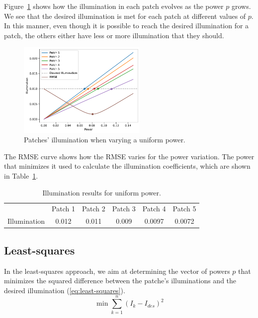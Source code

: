 \documentclass[11pt,a4paper]{article}
\begin{document}
Figure~\ref{fig:uniform-power} shows how the illumination in each patch evolves as the power $p$ grows. We see that the desired illumination is met for each patch at different values of $p$. In this manner, even though it is possible to reach the desired illumination for a patch, the others either have less or more illumination that they should.\\

\begin{figure}[!htb]
    \centering
    \includegraphics[width=0.55\textwidth]{figures/uniform-power.pdf}
    \caption{Patches' illumination when varying a uniform power.}\label{fig:uniform-power}
\end{figure}

The RMSE curve shows how the RMSE varies for the power variation. The power that minimizes it used to calculate the illumination coefficients, which are shown in Table~\ref{tab:uniform-power}.

\begin{table}[!htb]
    \centering
    \caption{Illumination results for uniform power.}
    \begin{tabular}{lccccc}
        \hline
        & Patch 1 & Patch 2 & Patch 3 & Patch 4 & Patch 5\\
        Illumination & 0.012 & 0.011& 0.009& 0.0097& 0.0072\\
        \hline
    \end{tabular}\label{tab:uniform-power}
\end{table}

\subsection{Least-squares}

In the least-squares approach, we aim at determining the vector of powers $p$ that minimizes the squared difference between the patche's illuminations and the desired illumination (\ref{eq:least-squares}).
\begin{equation}
    \min \displaystyle \sum_{k=1}^{n} (I_k - I_{des})^2
    \label{eq:least-squares}
\end{equation}
\end{document}
